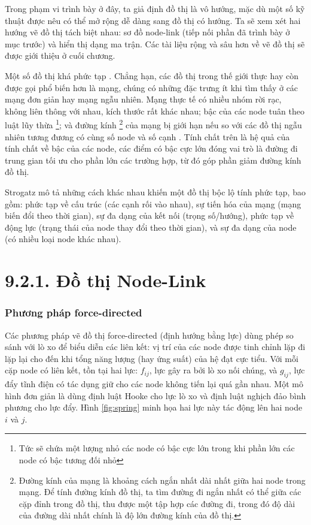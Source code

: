 \documentclass[12pt,a4paper, openany]{book}
\begin{document}
Trong phạm vi trình bày ở đây, ta giả định đồ thị là vô hướng, mặc dù một số kỹ thuật được nêu có thể mở rộng dễ dàng sang đồ thị có hướng. Ta sẽ xem xét hai hướng vẽ đồ thị tách biệt nhau: sơ đồ node-link (tiếp nối phần đã trình bày ở mục trước) và hiển thị dạng ma trận. Các tài liệu rộng và sâu hơn về vẽ đồ thị sẽ được giới thiệu ở cuối chương.

Một số đồ thị khá phức tạp \cite{costa2007,kim2008}. Chẳng hạn, các đồ thị trong thế giới thực hay còn được gọi phổ biến hơn là mạng, chúng có những đặc trưng ít khi tìm thấy ở các mạng đơn giản hay mạng ngẫu nhiên. Mạng thực tế có nhiều nhóm rời rạc, không liên thông với nhau, kích thước rất khác nhau; bậc của các node tuân theo luật lũy thừa \footnote{Tức sẽ chứa một lượng nhỏ các node có bậc cực lớn trong khi phần lớn các node có bậc tương đối nhỏ}; và đường kính \footnote{Đường kính của mạng là khoảng cách ngắn nhất dài nhất giữa hai node trong mạng. Để tính đường kính đồ thị, ta tìm đường đi ngắn nhất có thể giữa các cặp đỉnh trong đồ thị, thu được một tập hợp các đường đi, trong đó độ dài của đường dài nhất chính là độ lớn đường kính của đồ thị.} của mạng bị giới hạn nếu so với các đồ thị ngẫu nhiên tương đương có cùng số node và số cạnh \cite{albert2002,pagani2013}. Tính chất trên là hệ quả của tính chất về bậc của các node, các điểm có bậc cực lớn đóng vai trò là đường đi trung gian tối ưu cho phần lớn các trường hợp, từ đó góp phần giảm đường kính đồ thị.

Strogatz \cite{strogatz2001} mô tả những cách khác nhau khiến một đồ thị bộc lộ tính phức tạp, bao gồm: phức tạp về cấu trúc (các cạnh rối vào nhau), sự tiến hóa của mạng (mạng biến đổi theo thời gian), sự đa dạng của kết nối (trọng số/hướng), phức tạp về động lực (trạng thái của node thay đổi theo thời gian), và sự đa dạng của node (có nhiều loại node khác nhau).

\section*{9.2.1. Đồ thị Node-Link}

\subsubsection{Phương pháp force-directed} 

Các phương pháp vẽ đồ thị force-directed (định hướng bằng lực) dùng phép so sánh với lò xo để biểu diễn các liên kết: vị trí của các node được tinh chỉnh lặp đi lặp lại cho đến khi tổng năng lượng (hay ứng suất) của hệ đạt cực tiểu. Với mỗi cặp node có liên kết, tồn tại hai lực: $f_{ij}$, lực gây ra bởi lò xo nối chúng, và $g_{ij}$, lực đẩy tĩnh điện có tác dụng giữ cho các node không tiến lại quá gần nhau. Một mô hình đơn giản là dùng định luật Hooke cho lực lò xo và định luật nghịch đảo bình phương cho lực đẩy. Hình \ref{fig:spring} minh họa hai lực này tác động lên hai node $i$ và $j$.
\end{document}
